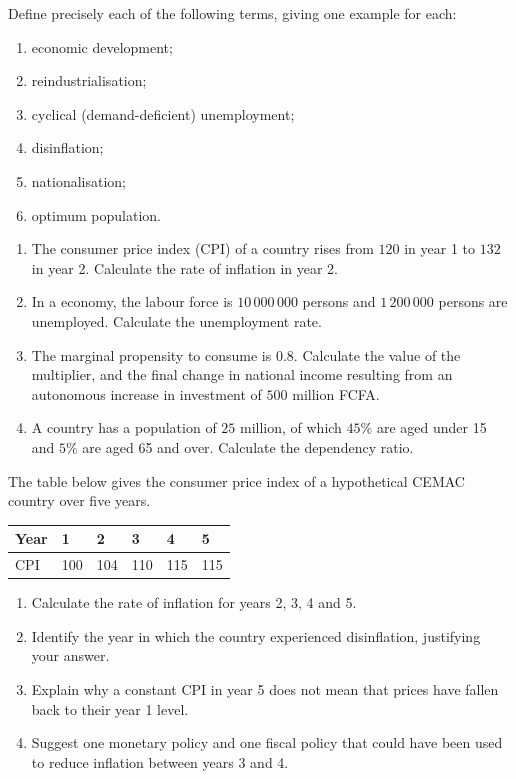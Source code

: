 \documentclass[11pt]{article}
\newcounter{popsec}
\newcounter{popsub}
\newcommand{\courssub}[1]{%
  \stepcounter{popsub}%
  \par\vspace{9pt}\noindent{\popxbold\fontsize{11.5}{13}\selectfont\color{popink}{\color{poporange}\thepopsec.\thepopsub}\hspace{6pt}#1}\par\nopagebreak\vspace{4pt}
}
\begin{document}
\begin{exercice}
Define precisely each of the following terms, giving one example for each:
\begin{enumerate}
\item economic development;
\item reindustrialisation;
\item cyclical (demand-deficient) unemployment;
\item disinflation;
\item nationalisation;
\item optimum population.
\end{enumerate}
\end{exercice}

\begin{exercice}
\begin{enumerate}
\item The consumer price index (CPI) of a country rises from $120$ in year 1 to $132$ in year 2. Calculate the rate of inflation in year 2.
\item In a economy, the labour force is $10\,000\,000$ persons and $1\,200\,000$ persons are unemployed. Calculate the unemployment rate.
\item The marginal propensity to consume is $0.8$. Calculate the value of the multiplier, and the final change in national income resulting from an autonomous increase in investment of $500$ million FCFA.
\item A country has a population of $25$ million, of which $45\%$ are aged under 15 and $5\%$ are aged 65 and over. Calculate the dependency ratio.
\end{enumerate}
\end{exercice}

\courssub{I practise}

\begin{exercice}
The table below gives the consumer price index of a hypothetical CEMAC country over five years.
\begin{center}
\begin{tabularx}{\linewidth}{|l|X|X|X|X|X|}
\hline
\rowcolor{popblueL} Year & 1 & 2 & 3 & 4 & 5 \\
\hline CPI & 100 & 104 & 110 & 115 & 115 \\
\hline
\end{tabularx}
\end{center}
\begin{enumerate}
\item Calculate the rate of inflation for years 2, 3, 4 and 5.
\item Identify the year in which the country experienced disinflation, justifying your answer.
\item Explain why a constant CPI in year 5 does not mean that prices have fallen back to their year 1 level.
\item Suggest one monetary policy and one fiscal policy that could have been used to reduce inflation between years 3 and 4.
\end{enumerate}
\end{exercice}
\end{document}
